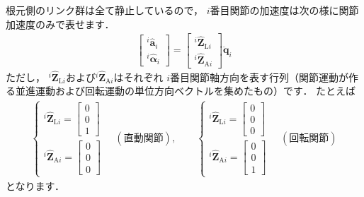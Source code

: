 \documentclass{jsarticle}
\begin{document}
根元側のリンク群は全て静止しているので，
$i$番目関節の加速度は次の様に関節加速度のみで表せます．
\begin{align*}
\left[\begin{array}{c}
{}^{i}\hat{\bm{a}}_{i}
\\
{}^{i}\hat{\bm{\alpha}}_{i}
\end{array}\right]
=
\left[\begin{array}{c}
{}^{i}\hat{\bm{Z}}_{\mathrm{L}i}
\\
{}^{i}\hat{\bm{Z}}_{\mathrm{A}i}
\end{array}\right]
\ddot{\bm{q}}_{i}
\end{align*}
ただし，
${}^{i}\hat{\bm{Z}}_{\mathrm{L}i}$および${}^{i}\hat{\bm{Z}}_{\mathrm{A}i}$はそれぞれ
$i$番目関節軸方向を表す行列（関節運動が作る並進運動および回転運動の単位方向ベクトルを集めたもの）です．
たとえば
\begin{align*}
\begin{cases}
{}^{i}\hat{\bm{Z}}_{\mathrm{L}i}=\left[\begin{array}{c}
 0 \\ 0 \\ 1
\end{array}\right] \\
{}^{i}\hat{\bm{Z}}_{\mathrm{A}i}=\left[\begin{array}{c}
 0 \\ 0 \\ 0
\end{array}\right]
\end{cases}
\quad(\mbox{直動関節})
,\qquad
\begin{cases}
{}^{i}\hat{\bm{Z}}_{\mathrm{L}i}=\left[\begin{array}{c}
 0 \\ 0 \\ 0
\end{array}\right] \\
{}^{i}\hat{\bm{Z}}_{\mathrm{A}i}=\left[\begin{array}{c}
 0 \\ 0 \\ 1
\end{array}\right]
\end{cases}
\quad(\mbox{回転関節})
\end{align*}
となります．
\end{document}
